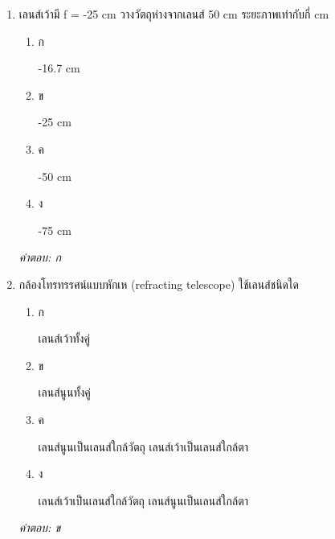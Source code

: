 \documentclass[12pt]{article}
\begin{document}
\begin{enumerate}[label=\arabic*., itemsep=0.5\baselineskip, topsep=0.5\baselineskip, leftmargin=*]
\item เลนส์เว้ามี f = -25 cm วางวัตถุห่างจากเลนส์ 50 cm ระยะภาพเท่ากับกี่ cm
\begin{enumerate}[label=\alph*)., itemsep=0.3\baselineskip, topsep=0.3\baselineskip]
\item ก\ 
\begin{minipage}[t]{0.9\linewidth}
\raggedright -16.7 cm
\end{minipage}
\item ข\ 
\begin{minipage}[t]{0.9\linewidth}
\raggedright -25 cm
\end{minipage}
\item ค\ 
\begin{minipage}[t]{0.9\linewidth}
\raggedright -50 cm
\end{minipage}
\item ง\ 
\begin{minipage}[t]{0.9\linewidth}
\raggedright -75 cm
\end{minipage}
\end{enumerate}
\vspace{-0.3\baselineskip}
\begin{small}
\textit{คำตอบ: ก}
\end{small}

\item กล้องโทรทรรศน์แบบหักเห (refracting telescope) ใช้เลนส์ชนิดใด
\begin{enumerate}[label=\alph*)., itemsep=0.3\baselineskip, topsep=0.3\baselineskip]
\item ก\ 
\begin{minipage}[t]{0.9\linewidth}
\raggedright เลนส์เว้าทั้งคู่
\end{minipage}
\item ข\ 
\begin{minipage}[t]{0.9\linewidth}
\raggedright เลนส์นูนทั้งคู่
\end{minipage}
\item ค\ 
\begin{minipage}[t]{0.9\linewidth}
\raggedright เลนส์นูนเป็นเลนส์ใกล้วัตถุ เลนส์เว้าเป็นเลนส์ใกล้ตา
\end{minipage}
\item ง\ 
\begin{minipage}[t]{0.9\linewidth}
\raggedright เลนส์เว้าเป็นเลนส์ใกล้วัตถุ เลนส์นูนเป็นเลนส์ใกล้ตา
\end{minipage}
\end{enumerate}
\vspace{-0.3\baselineskip}
\begin{small}
\textit{คำตอบ: ข}
\end{small}


\end{enumerate}
\end{document}
